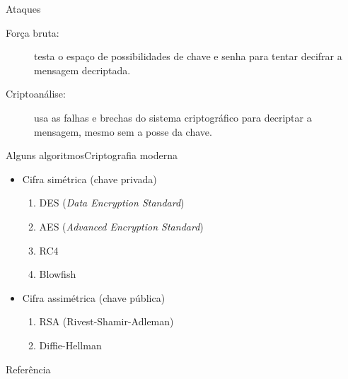 \begin{frame}{Ataques}

\begin{description}

\item[For\c{c}a bruta:] testa o espa\c{c}o de possibilidades de chave e senha para tentar 
decifrar a mensagem decriptada.

\item[Criptoan\'{a}lise:] usa as falhas e brechas do sistema criptogr\'{a}fico para decriptar 
a mensagem, mesmo sem a posse da chave.
\end{description}
\end{frame}

\begin{frame}{Alguns algoritmos}{Criptografia moderna}

  \begin{itemize}[<+-| alert@+>]
  \item Cifra simétrica (chave privada)
    \begin{enumerate}
    \item DES ({\it Data Encryption Standard})
    \item AES ({\it Advanced Encryption Standard})
    \item RC4
    \item Blowfish
    \end{enumerate}

  \item Cifra assimétrica (chave pública)
    \begin{enumerate}
    \item RSA (Rivest-Shamir-Adleman)
    \item Diffie-Hellman
    \end{enumerate}

  \end{itemize}
  
\end{frame}

\begin{frame}{Referência}
  \biblioref
\end{frame}  

